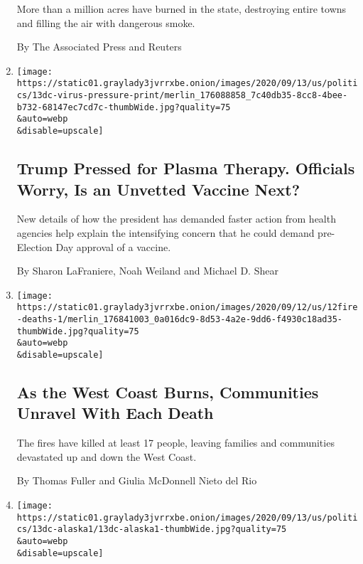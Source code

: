 \begin{enumerate}
  More than a million acres have burned in the state, destroying entire
  towns and filling the air with dangerous smoke.

  By The Associated Press and Reuters
\item
  \href{/2020/09/12/us/politics/trump-coronavirus-treatment-vaccine.html}{}

  \texttt{[image: https://static01.graylady3jvrrxbe.onion/images/2020/09/13/us/politics/13dc-virus-pressure-print/merlin\_176088858\_7c40db35-8cc8-4bee-b732-68147ec7cd7c-thumbWide.jpg?quality=75\\\&auto=webp\\\&disable=upscale]}

  \hypertarget{trump-pressed-for-plasma-therapy-officials-worry-is-an-unvetted-vaccine-next}{%
  \subsection{Trump Pressed for Plasma Therapy. Officials Worry, Is an
  Unvetted Vaccine
  Next?}\label{trump-pressed-for-plasma-therapy-officials-worry-is-an-unvetted-vaccine-next}}

  New details of how the president has demanded faster action from
  health agencies help explain the intensifying concern that he could
  demand pre-Election Day approval of a vaccine.

  By Sharon LaFraniere, Noah Weiland and Michael D. Shear
\item
  \href{/2020/09/12/us/wildfire-deaths.html}{}

  \texttt{[image: https://static01.graylady3jvrrxbe.onion/images/2020/09/12/us/12fire-deaths-1/merlin\_176841003\_0a016dc9-8d53-4a2e-9dd6-f4930c18ad35-thumbWide.jpg?quality=75\\\&auto=webp\\\&disable=upscale]}

  \hypertarget{as-the-west-coast-burns-communities-unravel-with-each-death-1}{%
  \subsection{As the West Coast Burns, Communities Unravel With Each
  Death}\label{as-the-west-coast-burns-communities-unravel-with-each-death-1}}

  The fires have killed at least 17 people, leaving families and
  communities devastated up and down the West Coast.

  By Thomas Fuller and Giulia McDonnell Nieto del Rio
\item
  \href{/2020/09/12/us/politics/alaska-democrats-independent-challengers.html}{}

  \texttt{[image: https://static01.graylady3jvrrxbe.onion/images/2020/09/13/us/politics/13dc-alaska1/13dc-alaska1-thumbWide.jpg?quality=75\\\&auto=webp\\\&disable=upscale]}


\end{enumerate}
